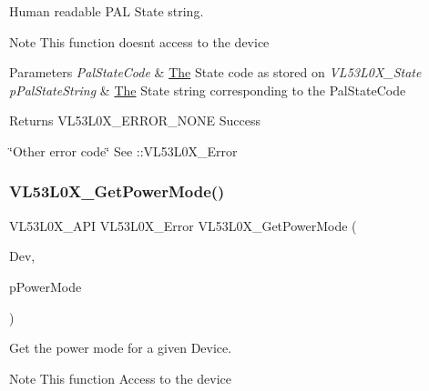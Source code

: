 Human readable P\+AL State string. 

\begin{DoxyNote}{Note}
This function doesn\textquotesingle{}t access to the device
\end{DoxyNote}

\begin{DoxyParams}{Parameters}
{\em Pal\+State\+Code} & \hyperlink{structThe}{The} State code as stored on {\itshape V\+L53\+L0\+X\+\_\+\+State} \\
\hline
{\em p\+Pal\+State\+String} & \hyperlink{structThe}{The} State string corresponding to the Pal\+State\+Code \\
\hline
\end{DoxyParams}
\begin{DoxyReturn}{Returns}
V\+L53\+L0\+X\+\_\+\+E\+R\+R\+O\+R\+\_\+\+N\+O\+NE Success 

\char`\"{}\+Other error code\char`\"{} See \+::\+V\+L53\+L0\+X\+\_\+\+Error 
\end{DoxyReturn}
\mbox{\label{group__VL53L0X__general__group_ga53faed55c6951878c58b6a19d613ee9b}} 
\subsubsection{\texorpdfstring{V\+L53\+L0\+X\+\_\+\+Get\+Power\+Mode()}{VL53L0X\_GetPowerMode()}}
{\footnotesize\ttfamily V\+L53\+L0\+X\+\_\+\+A\+PI V\+L53\+L0\+X\+\_\+\+Error V\+L53\+L0\+X\+\_\+\+Get\+Power\+Mode (\begin{DoxyParamCaption}\item[{\hyperlink{group__VL53L0X__platform__group_ga2d6405308b1dd524b462f1b8fb97d167}{V\+L53\+L0\+X\+\_\+\+D\+EV}}]{Dev,  }\item[{V\+L53\+L0\+X\+\_\+\+Power\+Modes $\ast$}]{p\+Power\+Mode }\end{DoxyParamCaption})}



Get the power mode for a given Device. 

\begin{DoxyNote}{Note}
This function Access to the device
\end{DoxyNote}

